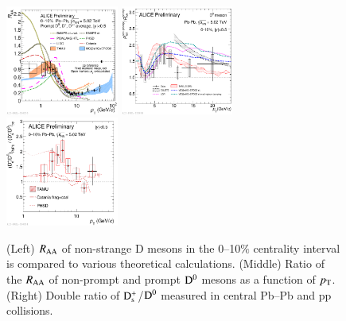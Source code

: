 \documentclass[3p,times,procedia]{elsarticle}
\newcommand{\pt}{p_{\rm T}}
\newcommand{\Dzero}{{\rm D^0}}
\newcommand{\Ds}{{\rm D_{s}^+}}
\newcommand{\RAA}{R_{\rm AA}}
\begin{document}
\begin{figure}[h]
\includegraphics[width=0.33\textwidth]{Plots/D/2019-10-31-2019-10-28-DmesonAverage_vs_transportmodels_010_5dot02.pdf}
\includegraphics[width=0.33\textwidth]{Plots/NP/2019-10-31-2019-10-29-D0PbPb5TeV_010_RaaRatio_wModel.pdf}
\includegraphics[width=0.33\textwidth]{Plots/D/2019-10-31-2019-10-28-DoubleRatio_DsOverDzero_PbPb2018_010_pp_WithModels.pdf}
\caption{(Left) $\RAA$ of non-strange D mesons in the 0--10$\%$ centrality interval is compared to various theoretical calculations. 
	(Middle) Ratio of the $\RAA$ of non-prompt and prompt $\Dzero$ mesons as a function of $\pt$. 
	(Right) Double ratio of $\Ds$/$\Dzero$ measured in central Pb--Pb and pp collisions.}
\label{fig:prompt_nonpromptRAA}
\end{figure}
\end{document}
